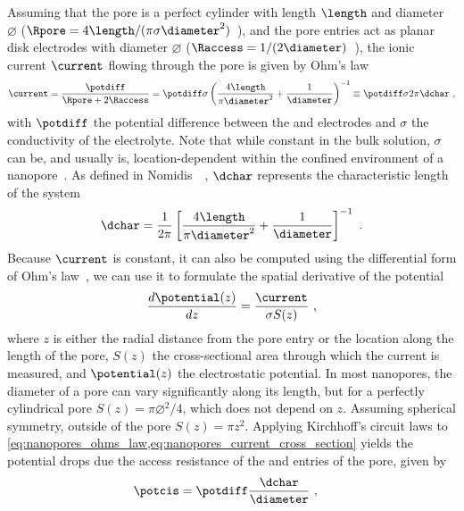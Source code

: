 Assuming that the pore is a perfect cylinder with length $\length$ and diameter $\diameter$ ($\Rpore = 4
\length / (\pi \sigma \diameter^2)$~\cite{Grosberg-2010}), and the pore entries act as planar disk electrodes
with diameter $\diameter$ ($\Raccess = 1 / (2\diameter)$~\cite{Hall-1975}), the ionic current $\current$
flowing through the pore is given by Ohm's law~\cite{Kowalczyk-2011}
%
\begin{equation}\label{eq:nanopores_ohms_law}
  \current = \dfrac{\potdiff}{\Rpore + 2 \Raccess} 
           = \potdiff \sigma \left( \dfrac{4 \length}{\pi \diameter^2} + \dfrac{1}{\diameter} \right)^{-1}
           \equiv \potdiff \sigma 2 \pi \dchar
  \text{ ,}
\end{equation}
%
with $\potdiff$ the potential difference between the \cisi{} and \transi{} electrodes and $\sigma$ the
conductivity of the electrolyte. Note that while constant in the bulk solution, $\sigma$ can be, and usually
is, location-dependent within the confined environment of a nanopore~\cite{Chinappi-2015}. As defined in
Nomidis~\etal{}~\cite{Nomidis-2018}, $\dchar$ represents the characteristic length of the system
%
\begin{equation}\label{eq:nanopores_characteristic_length}
  \dchar = \dfrac{1}{2\pi} \left[\dfrac{4 \length}{\pi\diameter^2} + \dfrac{1}{\diameter} \right]^{-1}
  \text{ .}
\end{equation}
%
Because $\current$ is constant, it can also be computed using the differential form of Ohm's
law~\cite{Chinappi-2015}, we can use it to formulate the spatial derivative of the potential
%
\begin{equation}\label{eq:nanopores_current_cross_section}
  \dfrac{d \potential(z)}{dz} = \dfrac{\current}{\sigma S(z)}
  \text{ ,}
\end{equation}
%
where $z$ is either the radial distance from the pore entry or the location along the length of the pore,
$S(z)$ the cross-sectional area through which the current is measured, and $\potential(z)$ the electrostatic
potential. In most nanopores, the diameter of a pore can vary significantly along its length, but for a
perfectly cylindrical pore $S(z) = \pi \diameter^2 / 4$, which does not depend on $z$. Assuming spherical
symmetry, outside of the pore $S(z) = \pi z^2$. Applying Kirchhoff's circuit laws to
\cref{eq:nanopores_ohms_law,eq:nanopores_current_cross_section} yields the potential drops due the access
resistance of the \cisi{} and \transi{} entries of the pore, given by
%
\begin{align}
  \potcis   ={}& \potdiff \dfrac{\dchar}{\diameter}
  \text{ ,}
\end{align}
